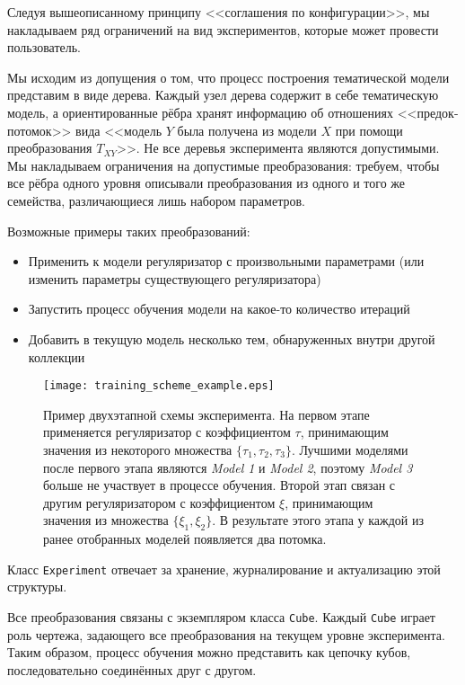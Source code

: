 Следуя вышеописанному принципу <<соглашения по конфигурации>>, мы накладываем ряд ограничений на вид экспериментов, которые может провести пользователь.

Мы исходим из допущения о том, что процесс построения тематической модели представим в виде дерева. Каждый узел дерева содержит в себе тематическую модель, а ориентированные рёбра хранят информацию об отношениях <<предок-потомок>> вида <<модель $Y$ была получена из модели $X$ при помощи преобразования $T_{XY}$>>. Не все деревья эксперимента являются допустимыми. Мы накладываем ограничения на допустимые преобразования: требуем, чтобы все рёбра одного уровня описывали преобразования из одного и того же семейства, различающиеся лишь набором параметров.  

Возможные примеры таких преобразований: 

\begin{itemize}
    \item Применить к модели регуляризатор с произвольными параметрами (или изменить параметры существующего регуляризатора)
    \item Запустить процесс обучения модели на какое-то количество итераций
    \item Добавить в текущую модель несколько тем, обнаруженных внутри другой коллекции
\end{itemize} 

\begin{figure}[t]
    \centering
    \texttt{[image: training\_scheme\_example.eps]}
    \caption{
        Пример двухэтапной схемы эксперимента.
        На первом этапе применяется регуляризатор с коэффициентом $\tau$, принимающим значения из некоторого множества $\{\tau_1, \tau_2, \tau_3\}$.
        Лучшими моделями после первого этапа являются \emph{Model 1} и \emph{Model 2}, поэтому \emph{Model 3} больше не участвует в процессе обучения.
        Второй этап связан с другим регуляризатором с коэффициентом $\xi$, принимающим значения из множества $\{\xi_1, \xi_2\}$.
        В результате этого этапа у каждой из ранее отобранных моделей  появляется два потомка.}
\label{Training-scheme}
\end{figure} 

Класс \texttt{Experiment} отвечает за хранение, журналирование и актуализацию этой структуры.  

Все преобразования связаны с экземпляром класса \texttt{Cube}. Каждый \texttt{Cube} играет роль чертежа, задающего все преобразования на текущем уровне эксперимента. Таким образом, процесс обучения можно представить как цепочку кубов, последовательно соединённых друг с другом.  

